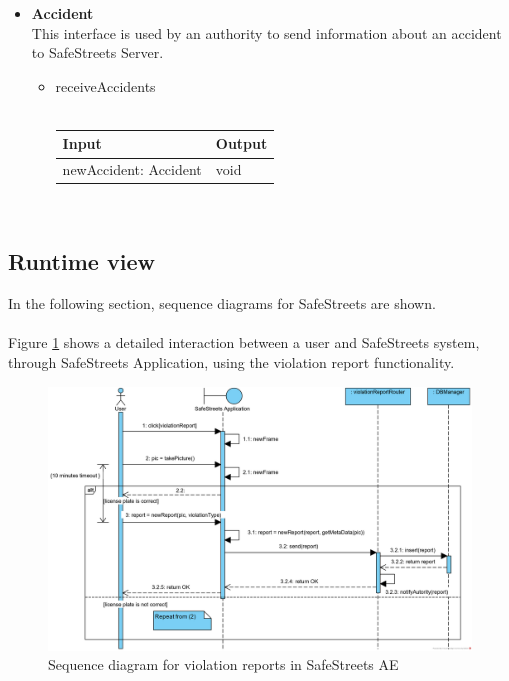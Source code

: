 \documentclass{article}
\begin{document}
\begin{itemize}
			\item \textbf{Accident}\\
				This interface is used by an authority to send information about an accident to SafeStreets Server.
				\begin{itemize}
					\item{receiveAccidents}\\\\
					\begin{tabular}{l | l}
						\textbf{Input} & \textbf{Output}\\
						\hline
						newAccident: Accident & void\\
					\end{tabular}\\
				\end{itemize}
		\end{itemize}
	
		\clearpage
		\subsection{Runtime	view}
			In the following section, sequence diagrams for SafeStreets are shown.\\\\
			Figure \ref{fig:sd-violationReport} shows a detailed interaction between a user and SafeStreets system, through SafeStreets Application, using the violation report functionality.\\
			
			\begin{figure}[H]
				\includegraphics [scale=0.7] {diagrams/DD_SeqD_ViolationReport.png}
				\caption[Sequence diagram]{Sequence diagram for violation reports in SafeStreets AE}
				\label{fig:sd-violationReport}
			\end{figure}
		
\end{document}
